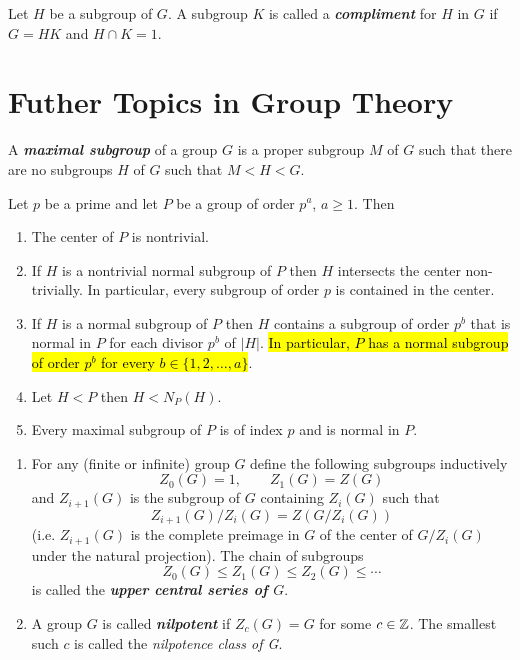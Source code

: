 \nl

\begin{defn}
Let $H$ be a subgroup of $G$. A subgroup $K$ is called a \textbf{\textit{compliment}} for $H$ in $G$ if $G = HK$ and $H\cap K = 1$.
\end{defn}


\section{Futher Topics in Group Theory}
\setcounter{thm}{0}

\begin{defn}
A \textbf{\textit{maximal subgroup}} of a group $G$ is a proper subgroup $M$ of $G$ such that there are no subgroups $H$ of $G$ such that $M<H<G$.
\end{defn}

\nl

\begin{thm}
Let $p$ be a prime and let $P$ be a group of order $p^a$, $a\geq 1$. Then
\begin{enumerate}
\item The center of $P$ is nontrivial.
\item If $H$ is a nontrivial normal subgroup of $P$ then $H$ intersects the center non-trivially. In particular, every subgroup of order $p$ is contained in the center.
\item If $H$ is a normal subgroup of $P$ then $H$ contains a subgroup of order $p^b$ that is normal in $P$ for each divisor $p^b$ of $|H|$. \hl{In particular, $P$ has a normal subgroup of order $p^b$ for every $b\in \{1,2,\ldots,a\}$}.
\item Let $H< P$ then $H<N_P(H)$.
\item Every maximal subgroup of $P$ is of index $p$ and is normal in $P$.
\end{enumerate}
\end{thm}

\nl

\begin{defn}\nl
\begin{enumerate}
\item For any (finite or infinite) group $G$ define the following subgroups inductively
\[Z_0(G) = 1,\qquad Z_1(G)= Z(G)\]
and $Z_{i+1}(G)$ is the subgroup of $G$ containing $Z_i(G)$ such that
\[Z_{i+1}(G)/Z_i(G) = Z(G/Z_i(G))\]
(i.e. $Z_{i+1}(G)$ is the complete preimage in $G$ of the center of $G/Z_i(G)$ under the natural projection). The chain of subgroups
\[Z_0(G)\leq Z_1(G)\leq Z_2(G)\leq\cdots\]
is called the\textbf{ \textit{upper central series of $G$}}.
\item A group $G$ is called \textit{\textbf{nilpotent}} if $Z_c(G) = G$ for some $c\in \mathbb{Z}$. The smallest such $c$ is called the \textit{nilpotence class of G}.
\end{enumerate}
\end{defn}

